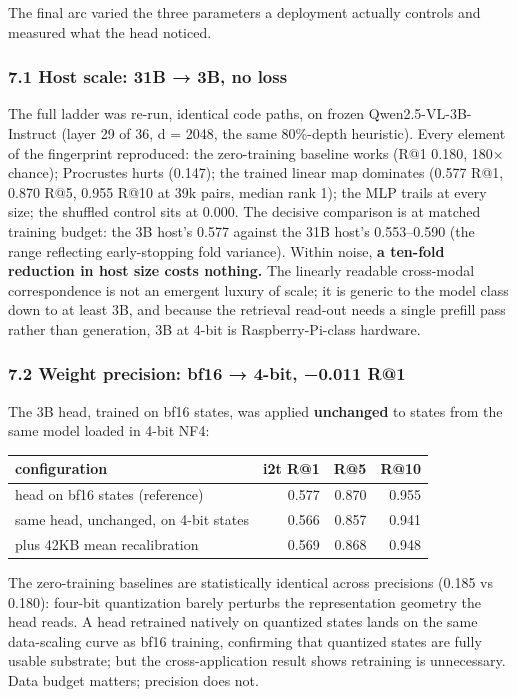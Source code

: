 \documentclass[
  11pt,
]{article}
\newcounter{none} %
\begin{document}
The final arc varied the three parameters a deployment actually controls
and measured what the head noticed.

\subsubsection{7.1 Host scale: 31B → 3B, no
loss}\label{host-scale-31b-3b-no-loss}

The full ladder was re-run, identical code paths, on frozen
Qwen2.5-VL-3B-Instruct (layer 29 of 36, d = 2048, the same 80\%-depth
heuristic). Every element of the fingerprint reproduced: the
zero-training baseline works (R@1 0.180, 180× chance); Procrustes hurts
(0.147); the trained linear map dominates (0.577 R@1, 0.870 R@5, 0.955
R@10 at 39k pairs, median rank 1); the MLP trails at every size; the
shuffled control sits at 0.000. The decisive comparison is at matched
training budget: the 3B host's 0.577 against the 31B host's 0.553--0.590
(the range reflecting early-stopping fold variance). Within noise,
\textbf{a ten-fold reduction in host size costs nothing.} The linearly
readable cross-modal correspondence is not an emergent luxury of scale;
it is generic to the model class down to at least 3B, and because the
retrieval read-out needs a single prefill pass rather than generation,
3B at 4-bit is Raspberry-Pi-class hardware.

\subsubsection{7.2 Weight precision: bf16 → 4-bit, −0.011
R@1}\label{weight-precision-bf16-4-bit-0.011-r1}

The 3B head, trained on bf16 states, was applied \textbf{unchanged} to
states from the same model loaded in 4-bit NF4:

{\def\LTcaptype{none} %
\begin{longtable}[]{@{}lrrr@{}}
\toprule\noalign{}
configuration & i2t R@1 & R@5 & R@10 \\
\midrule\noalign{}
\endhead
\bottomrule\noalign{}
\endlastfoot
head on bf16 states (reference) & 0.577 & 0.870 & 0.955 \\
same head, unchanged, on 4-bit states & 0.566 & 0.857 & 0.941 \\
plus 42KB mean recalibration & 0.569 & 0.868 & 0.948 \\
\end{longtable}
}

The zero-training baselines are statistically identical across
precisions (0.185 vs 0.180): four-bit quantization barely perturbs the
representation geometry the head reads. A head retrained natively on
quantized states lands on the same data-scaling curve as bf16 training,
confirming that quantized states are fully usable substrate; but the
cross-application result shows retraining is unnecessary. Data budget
matters; precision does not.
\end{document}
